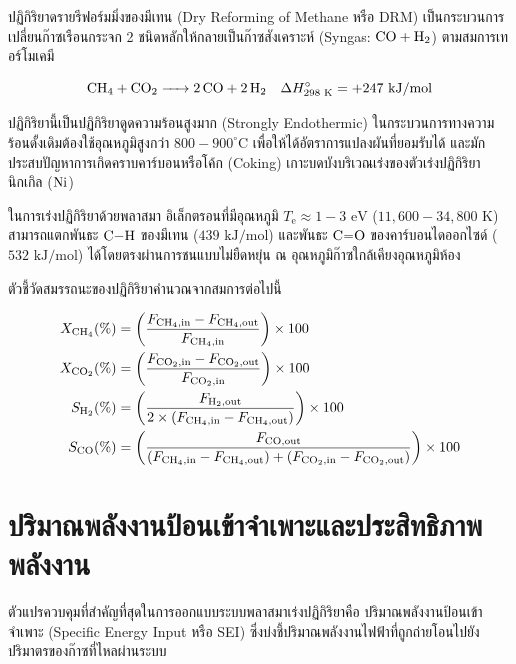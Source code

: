 ปฏิกิริยาดรายรีฟอร์มมิ่งของมีเทน (Dry Reforming of Methane หรือ DRM) เป็นกระบวนการเปลี่ยนก๊าซเรือนกระจก 2 ชนิดหลักให้กลายเป็นก๊าซสังเคราะห์ (Syngas: $\ce{CO + H2}$) ตามสมการเทอร์โมเคมี

\begin{equation}
    \ce{CH4 + CO2 -> 2 CO + 2 H2} \quad \Delta H_{298\text{ K}}^\circ = +247 \text{ kJ/mol}
    \label{eq:drm_reaction}
\end{equation}

ปฏิกิริยานี้เป็นปฏิกิริยาดูดความร้อนสูงมาก (Strongly Endothermic) ในกระบวนการทางความร้อนดั้งเดิมต้องใช้อุณหภูมิสูงกว่า $800 - 900^\circ\text{C}$ เพื่อให้ได้อัตราการแปลงผันที่ยอมรับได้ และมักประสบปัญหาการเกิดคราบคาร์บอนหรือโค้ก (Coking) เกาะบดบังบริเวณเร่งของตัวเร่งปฏิกิริยานิกเกิล ($\ce{Ni}$)

ในการเร่งปฏิกิริยาด้วยพลาสมา อิเล็กตรอนที่มีอุณหภูมิ $T_{\text{e}} \approx 1 - 3 \text{ eV}$ ($11,600 - 34,800 \text{ K}$) สามารถแตกพันธะ $\ce{C-H}$ ของมีเทน ($439 \text{ kJ/mol}$) และพันธะ $\ce{C=O}$ ของคาร์บอนไดออกไซด์ ($532 \text{ kJ/mol}$) ได้โดยตรงผ่านการชนแบบไม่ยืดหยุ่น ณ อุณหภูมิก๊าซใกล้เคียงอุณหภูมิห้อง

ตัวชี้วัดสมรรถนะของปฏิกิริยาคำนวณจากสมการต่อไปนี้

\begin{align}
    X_{\ce{CH4}} (\%) &= \left( \frac{F_{\ce{CH4}, \text{in}} - F_{\ce{CH4}, \text{out}}}{F_{\ce{CH4}, \text{in}}} \right) \times 100 \label{eq:x_ch4} \\
    X_{\ce{CO2}} (\%) &= \left( \frac{F_{\ce{CO2}, \text{in}} - F_{\ce{CO2}, \text{out}}}{F_{\ce{CO2}, \text{in}}} \right) \times 100 \label{eq:x_co2} \\
    S_{\ce{H2}} (\%) &= \left( \frac{F_{\ce{H2}, \text{out}}}{2 \times (F_{\ce{CH4}, \text{in}} - F_{\ce{CH4}, \text{out}})} \right) \times 100 \label{eq:s_h2} \\
    S_{\ce{CO}} (\%) &= \left( \frac{F_{\ce{CO}, \text{out}}}{(F_{\ce{CH4}, \text{in}} - F_{\ce{CH4}, \text{out}}) + (F_{\ce{CO2}, \text{in}} - F_{\ce{CO2}, \text{out}})} \right) \times 100 \label{eq:s_co}
\end{align}

\section{ปริมาณพลังงานป้อนเข้าจำเพาะและประสิทธิภาพพลังงาน}

ตัวแปรควบคุมที่สำคัญที่สุดในการออกแบบระบบพลาสมาเร่งปฏิกิริยาคือ ปริมาณพลังงานป้อนเข้าจำเพาะ (Specific Energy Input หรือ SEI) ซึ่งบ่งชี้ปริมาณพลังงานไฟฟ้าที่ถูกถ่ายโอนไปยังปริมาตรของก๊าซที่ไหลผ่านระบบ

